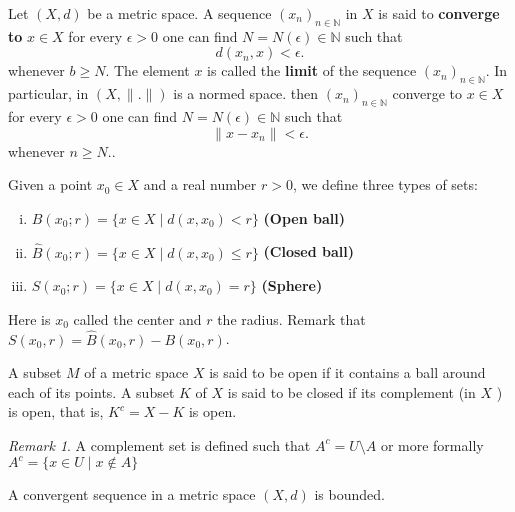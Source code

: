 \documentclass{article}
\theoremstyle{remark}
\newtheorem*{remark}{Remark}
\begin{document}
\begin{definition}[Sequence]
  Let $\left( X,d \right) $ be a metric space. A sequence $\left( x_{n} \right) _{n \in \mathbb{N}}$ in $X$ is said to \textbf{converge to} $x \in X$ for every $\epsilon > 0$ one can find $N=N(\epsilon) \in \mathbb{N}$ such that \[
    d\left( x_n, x \right) <  \epsilon 
  .\] whenever $b \ge N$. The element $x$ is called the \textbf{limit} of the sequence $\left( x_{n} \right) _{n \in \mathbb{N}}$. In particular, in $\left( X,\|.\| \right) $ is a normed space. then $\left( x_{n} \right) _{n \in \mathbb{N}}$ converge to $x \in X$ for every $\epsilon > 0$ one can find $N = N\left( \epsilon \right) \in \mathbb{N}$ such that \[
  \|x - x_{n} \| < \epsilon
  .\] whenever $n \ge N$..
\end{definition}

\begin{definition}
  Given a point $x_0 \in X$ and a real number $r>0$, we define three types of sets:
  \begin{enumerate}[(i)]
    \item $B\left( x_0; r \right)  = \{x\in X  \mid d\left( x,x_0 \right) < r\} $ \textbf{(Open ball)} 
    \item $\hat{B}\left( x_0; r \right)  = \{x\in X  \mid d\left( x,x_0 \right) \le r \} $ \textbf{(Closed ball)} 
    \item $S\left( x_0; r \right)  = \{x\in X  \mid d\left( x,x_0 \right) = r\} $ \textbf{(Sphere)} 
  \end{enumerate}

  Here is $x_0$ called the center and $r$ the radius. Remark that $S\left( x_0, r \right)  = \hat{B}\left( x_0,r \right) - B\left( x_0,r \right) $.
\end{definition}


\begin{definition}
  A subset $M$ of a metric space $X$ is said to be open if it contains a ball around each of its points. A subset $K$ of $X$ is said to be closed if its complement (in $X$ ) is open, that is, $K^{c} = X - K$ is open.  
\end{definition}

\begin{remark}
  A complement set is defined such that $A^{c} = U \setminus A $ or more formally $A^{c} = \{x \in U  \mid x \not\in A \} $
\end{remark}

\begin{lemma}
  A convergent sequence in a metric space $\left( X,d \right) $ is bounded. 
\end{lemma}
\end{document}
